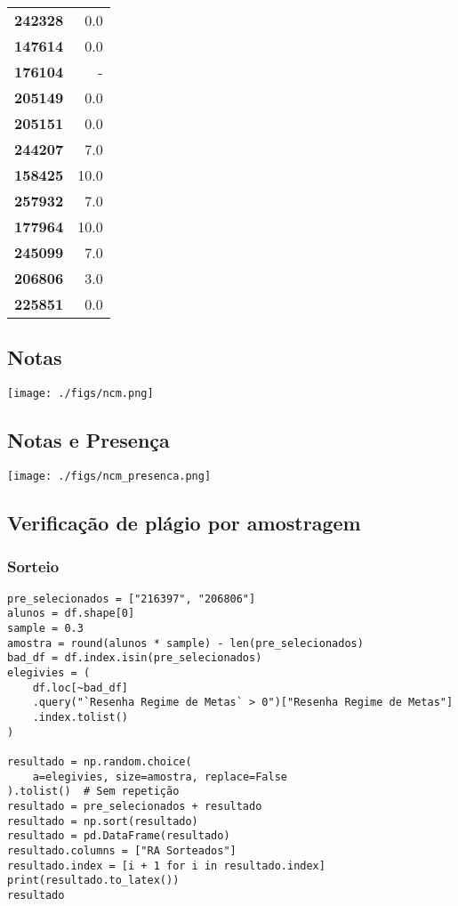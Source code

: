 \documentclass[11pt]{article}
\begin{document}
\begin{center}
\begin{longtable}{lr}
\textbf{242328} &                      0.0 \\
\textbf{147614} &                      0.0 \\
\textbf{176104} &                        - \\
\textbf{205149} &                      0.0 \\
\textbf{205151} &                      0.0 \\
\textbf{244207} &                      7.0 \\
\textbf{158425} &                     10.0 \\
\textbf{257932} &                      7.0 \\
\textbf{177964} &                     10.0 \\
\textbf{245099} &                      7.0 \\
\textbf{206806} &                      3.0 \\
\textbf{225851} &                      0.0 \\
\end{longtable}
\end{center}
\subsection{Notas}
\label{sec:org078d22a}
\begin{center}
\texttt{[image: ./figs/ncm.png]}
\end{center}


\subsection{Notas e Presença}
\label{sec:org205abf6}
\begin{center}
\texttt{[image: ./figs/ncm\_presenca.png]}
\end{center}
\subsection{Verificação de plágio por amostragem}
\label{sec:org30b5926}
\subsubsection{Sorteio}
\label{sec:orgab9fc2a}

\begin{verbatim}
pre_selecionados = ["216397", "206806"]
alunos = df.shape[0]
sample = 0.3
amostra = round(alunos * sample) - len(pre_selecionados)
bad_df = df.index.isin(pre_selecionados)
elegivies = (
    df.loc[~bad_df]
    .query("`Resenha Regime de Metas` > 0")["Resenha Regime de Metas"]
    .index.tolist()
)

resultado = np.random.choice(
    a=elegivies, size=amostra, replace=False
).tolist()  # Sem repetição
resultado = pre_selecionados + resultado
resultado = np.sort(resultado)
resultado = pd.DataFrame(resultado)
resultado.columns = ["RA Sorteados"]
resultado.index = [i + 1 for i in resultado.index]
print(resultado.to_latex())
resultado
\end{verbatim}
\end{document}
